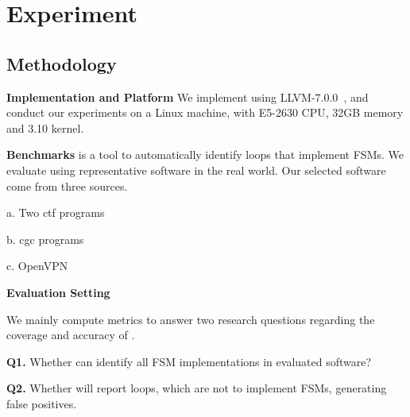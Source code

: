 \section{Experiment}

\subsection{Methodology}


\noindent\textbf{Implementation and Platform} 
We implement \Tool{} using LLVM-7.0.0~\cite{LLVM}, 
and conduct our experiments on a Linux machine, 
with E5-2630 CPU, 32GB memory and 3.10 kernel. 

\noindent\textbf{Benchmarks}
\Tool{} is a tool to automatically identify loops that implement FSMs. 
We evaluate \Tool{} using representative software in the real world. 
Our selected software come from three sources. 

a. Two ctf programs

b. cgc programs 

c. OpenVPN

\noindent\textbf{Evaluation Setting}


We mainly compute metrics to answer two research questions regarding the coverage and accuracy of \Tool{}.

\textbf{Q1.} Whether \Tool{} can identify all FSM implementations in evaluated software?
 
\textbf{Q2.} Whether \Tool{} will report loops, which are not to implement FSMs, 
generating false positives. 


